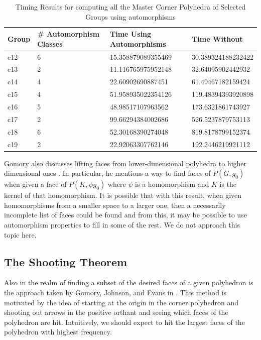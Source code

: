 \documentclass{article}
\begin{document}
	\begin{table}[]
		\centering
		\caption{Timing Results for computing all the Master Corner Polyhedra of Selected Groups using automorphisms}
		\label{automorphisms}
		\begin{tabular}{@{}llll@{}}
			\toprule
			Group & \# Automorphism Classes & Time Using Automorphisms & Time Without       \\ \midrule
			c12   & 6                & 15.358879089355469       & 30.389324188232422 \\
			c13   & 2                & 11.116765975952148       & 32.64095902442932  \\
			c14   & 4                & 22.60902690887451        & 61.49467182159424  \\
			c15   & 4                & 51.958935022354126       & 119.48394393920898 \\
			c16   & 5                & 48.98517107963562        & 173.6321861743927  \\
			c17   & 2                & 99.66294384002686        & 526.5237879753113  \\
			c18   & 6                & 52.30168390274048        & 819.8178799152374  \\
			c19   & 2                & 22.92063307762146        & 192.2446219921112  \\ \bottomrule
		\end{tabular}
	\end{table}
	
	Gomory also discusses lifting faces from lower-dimensional polyhedra to higher dimensional ones \cite{gomory1969some}. In particular, he mentions a way to find faces of $P(G, g_0)$ when given a face of $P(K, \psi g_0)$ where $\psi$ is a homomorphism and $K$ is the kernel of that homomorphism. It is possible that with this result, when given homomorphisms from a smaller space to a larger one, then a necessarily incomplete list of faces could be found and from this, it may be possible to use automorphism properties to fill in some of the rest. We do not approach this topic here.
	
	\subsection{The Shooting Theorem}
	Also in the realm of finding a subset of the desired faces of a given polyhedron is the approach taken by Gomory, Johnson, and Evans in \cite{gomory2003corner}. This method is motivated by the idea of starting at the origin in the corner polyhedron and shooting out arrows in the positive orthant and seeing which faces of the polyhedron are hit. Intuitively, we should expect to hit the largest faces of the polyhedron with highest frequency.
	
\end{document}
